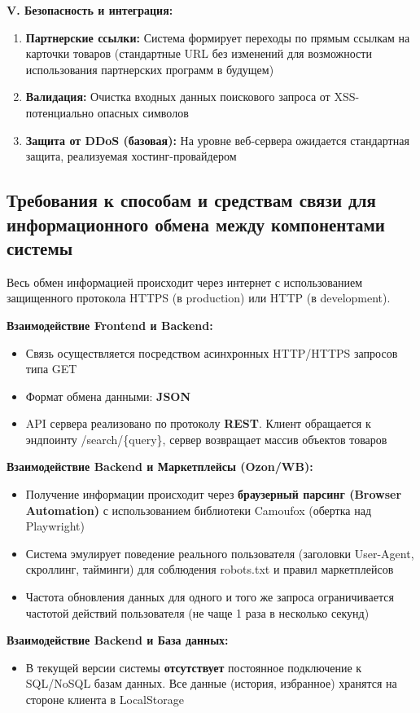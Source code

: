 \documentclass[a4paper,12pt]{article}
\begin{document}
\textbf{V. Безопасность и интеграция:}
\begin{enumerate}
	\item \textbf{Партнерские ссылки:} Система формирует переходы по прямым ссылкам на карточки товаров (стандартные URL без изменений для возможности использования партнерских программ в будущем)
	\item \textbf{Валидация:} Очистка входных данных поискового запроса от XSS-потенциально опасных символов
	\item \textbf{Защита от DDoS (базовая):} На уровне веб-сервера ожидается стандартная защита, реализуемая хостинг-провайдером
\end{enumerate}

\subsection{Требования к способам и средствам связи для информационного обмена между компонентами системы}

Весь обмен информацией происходит через интернет с использованием защищенного протокола HTTPS (в production) или HTTP (в development).

\textbf{Взаимодействие Frontend и Backend:}
\begin{itemize}
	\item Связь осуществляется посредством асинхронных HTTP/HTTPS запросов типа GET
	\item Формат обмена данными: \textbf{JSON}
	\item API сервера реализовано по протоколу \textbf{REST}. Клиент обращается к эндпоинту /search/\{query\}, сервер возвращает массив объектов товаров
\end{itemize}

\textbf{Взаимодействие Backend и Маркетплейсы (Ozon/WB):}
\begin{itemize}
	\item Получение информации происходит через \textbf{браузерный парсинг (Browser Automation)} с использованием библиотеки Camoufox (обертка над Playwright)
	\item Система эмулирует поведение реального пользователя (заголовки User-Agent, скроллинг, тайминги) для соблюдения robots.txt и правил маркетплейсов
	\item Частота обновления данных для одного и того же запроса ограничивается частотой действий пользователя (не чаще 1 раза в несколько секунд)
\end{itemize}

\textbf{Взаимодействие Backend и База данных:}
\begin{itemize}
	\item В текущей версии системы \textbf{отсутствует} постоянное подключение к SQL/NoSQL базам данных. Все данные (история, избранное) хранятся на стороне клиента в LocalStorage
\end{itemize}
\end{document}
